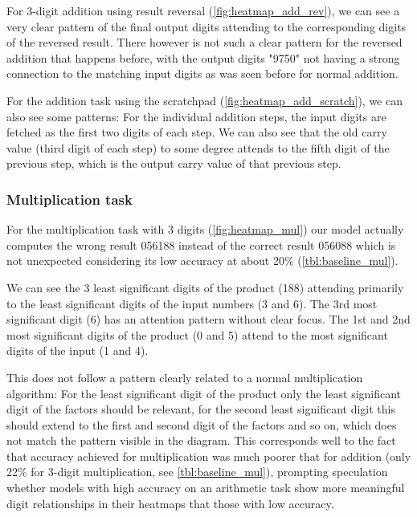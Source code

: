 
For 3-digit addition using result reversal (\cref{fig:heatmap_add_rev}), we can see a very clear pattern of the final output digits attending to the corresponding digits of the reversed result. There however is not such a clear pattern for the reversed addition that happens before, with the output digits "9750" not having a strong connection to the matching input digits as was seen before for normal addition.


For the addition task using the scratchpad (\cref{fig:heatmap_add_scratch}), we can also see some patterns: For the individual addition steps, the input digits are fetched as the first two digits of each step. We can also see that the old carry value (third digit of each step) to some degree attends to the fifth digit of the previous step, which is the output carry value of that previous step.

\subsubsection{Multiplication task}


For the multiplication task with 3 digits (\cref{fig:heatmap_mul}) our model actually computes the wrong result 056188 instead of the correct result 056088 which is not unexpected considering its low accuracy at about 20\% (\cref{tbl:baseline_mul}).

We can see the 3 least significant digits of the product (188) attending primarily to the  least significant digits of the input numbers (3 and 6). The 3rd most significant digit (6) has an attention pattern without clear focus. The 1st and 2nd most significant digits of the product (0 and 5) attend to the most significant digits of the input (1 and 4).

This does not follow a pattern clearly related to a normal multiplication algorithm: For the least significant digit of the product only the least significant digit of the factors should be relevant, for the second least significant digit this should extend to the first and second digit of the factors and so on, which does not match the pattern visible in the diagram.
This corresponds well to the fact that accuracy achieved for multiplication was much poorer that for addition (only 22\% for 3-digit multiplication, see \cref{tbl:baseline_mul}), prompting speculation whether models with high accuracy on an arithmetic task show more meaningful digit relationships in their heatmaps that those with low accuracy.

